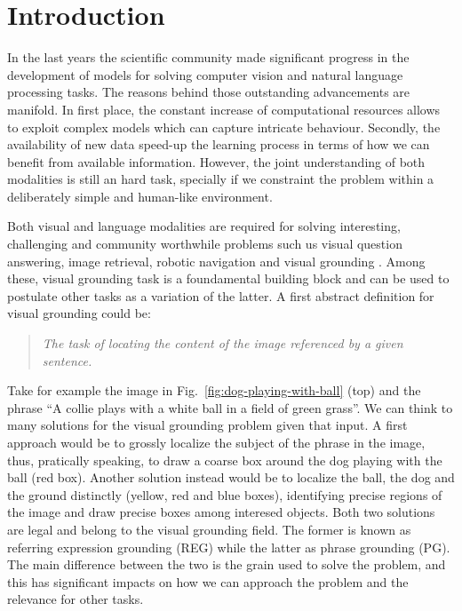 \chapter{Introduction}
\label{introduction}

In the last years the scientific community made significant progress
in the development of models for solving computer vision and natural
language processing tasks. The reasons behind those outstanding
advancements are manifold. In first place, the constant increase of
computational resources allows to exploit complex models which can
capture intricate behaviour. Secondly, the availability of new data
speed-up the learning process in terms of how we can benefit from
available information. However, the joint understanding of both
modalities is still an hard task, specially if we constraint the
problem within a deliberately simple and human-like environment.

Both visual and language modalities are required for solving
interesting, challenging and community worthwhile problems such us
visual question answering, image retrieval, robotic navigation and
visual grounding . Among these, visual grounding
task is a foundamental building block and can be used to postulate
other tasks as a variation of the latter. A first abstract definition
for visual grounding could be:

\begin{quote}
    \textit{The task of locating the content of the image referenced
    by a given sentence.}
\end{quote}

Take for example the image in Fig.~\ref{fig:dog-playing-with-ball}
(top) and the phrase ``A collie plays with a white ball in a field of
green grass''. We can think to many solutions for the visual grounding
problem given that input. A first approach would be to grossly
localize the subject of the phrase in the image, thus, pratically
speaking, to draw a coarse box around the dog playing with the ball
(red box). Another solution instead would be to localize the ball, the
dog and the ground distinctly (yellow, red and blue boxes),
identifying precise regions of the image and draw precise boxes among
interesed objects. Both two solutions are legal and belong to the
visual grounding field. The former is known as referring expression
grounding (REG) while the latter as phrase grounding (PG). The main
difference between the two is the grain used to solve the problem, and
this has significant impacts on how we can approach the problem and
the relevance for other tasks.

